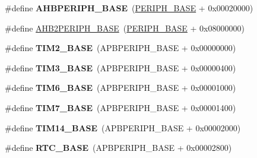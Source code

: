 \begin{DoxyCompactItemize}
\item 
\mbox{\label{group___peripheral__memory__map_ga92eb5d49730765d2abd0f5b09548f9f5}} 
\#define {\bfseries A\+H\+B\+P\+E\+R\+I\+P\+H\+\_\+\+B\+A\+SE}~(\hyperlink{group___peripheral__memory__map_ga9171f49478fa86d932f89e78e73b88b0}{P\+E\+R\+I\+P\+H\+\_\+\+B\+A\+SE} + 0x00020000)
\item 
\#define \hyperlink{group___peripheral__memory__map_gaeedaa71d22a1948492365e2cd26cfd46}{A\+H\+B2\+P\+E\+R\+I\+P\+H\+\_\+\+B\+A\+SE}~(\hyperlink{group___peripheral__memory__map_ga9171f49478fa86d932f89e78e73b88b0}{P\+E\+R\+I\+P\+H\+\_\+\+B\+A\+SE} + 0x08000000)
\item 
\mbox{\label{group___peripheral__memory__map_ga00d0fe6ad532ab32f0f81cafca8d3aa5}} 
\#define {\bfseries T\+I\+M2\+\_\+\+B\+A\+SE}~(A\+P\+B\+P\+E\+R\+I\+P\+H\+\_\+\+B\+A\+SE + 0x00000000)
\item 
\mbox{\label{group___peripheral__memory__map_gaf0c34a518f87e1e505cd2332e989564a}} 
\#define {\bfseries T\+I\+M3\+\_\+\+B\+A\+SE}~(A\+P\+B\+P\+E\+R\+I\+P\+H\+\_\+\+B\+A\+SE + 0x00000400)
\item 
\mbox{\label{group___peripheral__memory__map_ga8268ec947929f192559f28c6bf7d1eac}} 
\#define {\bfseries T\+I\+M6\+\_\+\+B\+A\+SE}~(A\+P\+B\+P\+E\+R\+I\+P\+H\+\_\+\+B\+A\+SE + 0x00001000)
\item 
\mbox{\label{group___peripheral__memory__map_ga0ebf54364c6a2be6eb19ded6b18b6387}} 
\#define {\bfseries T\+I\+M7\+\_\+\+B\+A\+SE}~(A\+P\+B\+P\+E\+R\+I\+P\+H\+\_\+\+B\+A\+SE + 0x00001400)
\item 
\mbox{\label{group___peripheral__memory__map_ga862855347d6e1d92730dfe17ee8e90b8}} 
\#define {\bfseries T\+I\+M14\+\_\+\+B\+A\+SE}~(A\+P\+B\+P\+E\+R\+I\+P\+H\+\_\+\+B\+A\+SE + 0x00002000)
\item 
\mbox{\label{group___peripheral__memory__map_ga4265e665d56225412e57a61d87417022}} 
\#define {\bfseries R\+T\+C\+\_\+\+B\+A\+SE}~(A\+P\+B\+P\+E\+R\+I\+P\+H\+\_\+\+B\+A\+SE + 0x00002800)
\item 

\end{DoxyCompactItemize}
